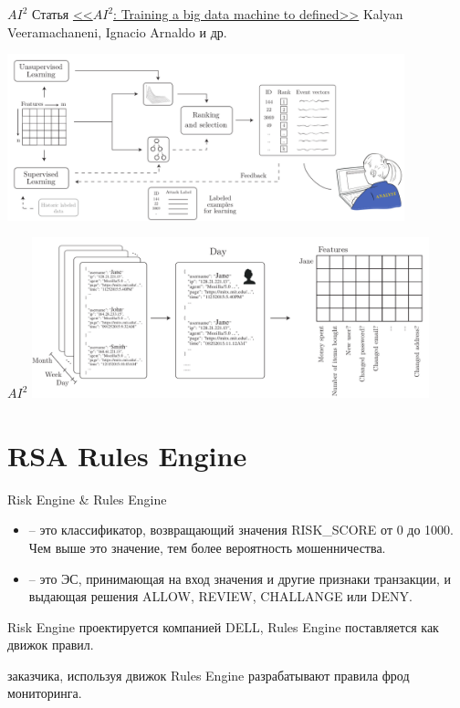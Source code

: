 \begin{frame}{$AI^2$}
	Статья \textcolor{blue}{\href{https://yadi.sk/i/dJ-SrV4y3JFSPV}{<<$AI^2$: Training a big data machine to defined>>}} Kalyan Veeramachaneni, Ignacio Arnaldo и др.
	
		\includegraphics[width=11.5cm]{../pic/ai2_first.png}	
\end{frame}


\begin{frame}{$AI^2$}
	\includegraphics[width=11.5cm]{../pic/ai2_second.png}
\end{frame}

\section{RSA Rules Engine}

\begin{frame}{Risk Engine \& Rules Engine}
	\begin{itemize}
		\item {} -- это классификатор, 
		возвращающий значения RISK\_SCORE от 0 до 1000. 
		Чем выше это значение, тем более вероятность мошенничества.
		\item {} -- это ЭС,
		принимающая на вход значения 
		и другие признаки транзакции, и выдающая решения
		ALLOW, REVIEW, CHALLANGE или DENY.
	\end{itemize}
	
	Risk Engine проектируется компанией DELL, 
	Rules Engine поставляется как движок правил. 
	
	 заказчика, используя движок Rules Engine разрабатывают 
	правила фрод мониторинга.
\end{frame}


